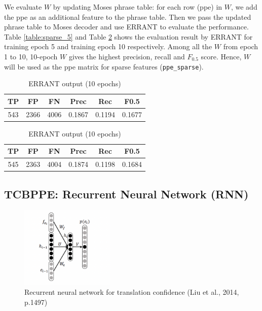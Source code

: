 \documentclass[12pt,a4paper,twoside,openright]{report}
\begin{document}
We evaluate $W$ by updating Moses phrase table: for each row (ppe) in $W$, we add the ppe as an additional feature to the phrase table. Then we pass the updated phrase table to Moses decoder and use ERRANT to evaluate the performance. Table \ref{table:sparse_5} and Table \ref{table:sparse_10} shows the evaluation result by ERRANT for training epoch 5 and training epoch 10 respectively. Among all the $W$ from epoch 1 to 10, 10-epoch $W$ gives the highest precision, recall and $F_{0.5}$ score. Hence, $W$ will be used as the ppe matrix for sparse features (\texttt{ppe\_sparse}).

\begin{table}[ht]
    \centering
    \begin{tabular}{ |c|c|c|c|c|c| } 
     \hline
     TP & FP & FN & Prec & Rec & F0.5 \\ [0.5ex] 
     \hline
     543 & 2366 & 4006 & 0.1867 & 0.1194 & 0.1677 \\ 
     \hline
    \end{tabular}
    \caption{ERRANT output (5 epochs)}
    \label{table:sparse_5}
    
    \vspace{1em}
    
    \begin{tabular}{ |c|c|c|c|c|c| } 
     \hline
     TP & FP & FN & Prec & Rec & F0.5 \\ [0.5ex] 
     \hline
     545 & 2363 & 4004 & 0.1874 & 0.1198 & 0.1684 \\ 
     \hline
    \end{tabular}
    \caption{ERRANT output (10 epochs)}
    \label{table:sparse_10}
\end{table}

\subsection{TCBPPE: Recurrent Neural Network (RNN)} \label{TCBPPE_rnn}

\begin{figure}[ht]
\centering
\includegraphics[width=0.4\textwidth]{images/rnn_ppe.png}
\caption{Recurrent neural network for translation confidence (Liu et al., 2014, p.1497)}
\label{fig:rnn_ppe}
\end{figure}
\end{document}
